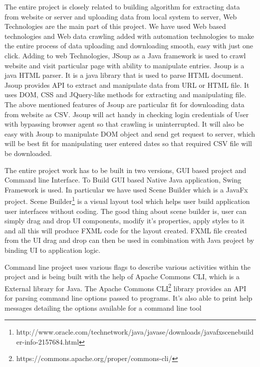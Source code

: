\documentclass[article,type=msc,colorback,accentcolor=tud9c,twoside,11pt]{tudthesis}
\begin{document}
The entire project is closely related to building algorithm for extracting data from website or server and uploading data from local system to server, Web Technologies are the main part of this project. We have used Web based technologies and Web data crawling added with automation technologies to make the entire process of data uploading and downloading smooth, easy with just one click. Adding to web Technologies, JSoup\cite{Jsoup} as a Java framework is used to crawl website and visit particular page with ability to manipulate entries. Jsoup is a java HTML parser. It is a java library that is used to parse HTML\cite{BeaqleJSHTML} document. Jsoup provides API to extract and manipulate data from URL or HTML file. It uses DOM, CSS and JQuery-like methods for extracting and manipulating file. The above mentioned features of Jsoup are particular fit for downloading data from website as CSV. Jsoup will act handy in checking login credentials of User with bypassing browser agent so that crawling is uninterrupted. It will also be easy with Jsoup to manipulate DOM object and send get request to server, which will be best fit for manipulating user entered dates so that required CSV file will be downloaded. 

The entire project work has to be built in two versions, GUI based project and Command line Interface. To Build GUI based Native Java application, Swing Framework is used. In particular we have used Scene Builder which is a JavaFx\cite{JavaFx} project. Scene Builder\footnote{http://www.oracle.com/technetwork/java/javase/downloads/javafxscenebuilder-info-2157684.html} is a visual layout tool which helps user build application user interfaces without coding. The good thing about scene builder is, user can simply drag and drop UI components, modify it's properties, apply styles to it and all this will produce FXML code for the layout created. FXML file created from the UI drag and drop can then be used in combination with Java project by binding UI to application logic. 

Command line project uses various flags to describe various activities within the project and is being built with the help of Apache Commons CLI, which is a External library for Java. The Apache Commons CLI\footnote{https://commons.apache.org/proper/commons-cli/} library provides an API for parsing command line options passed to programs. It's also able to print help messages detailing the options available for a command line tool
 
\end{document}
